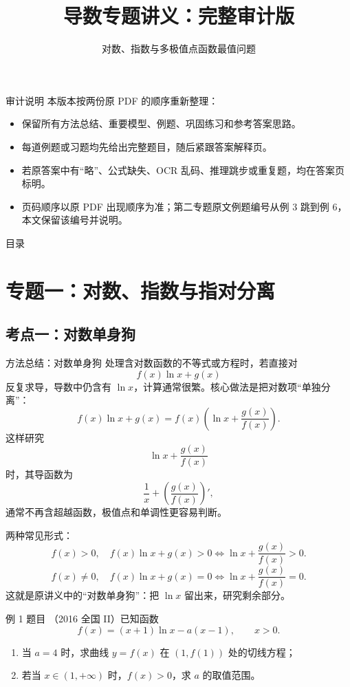 ﻿\documentclass[aspectratio=169,10pt]{ctexbeamer}
\title{导数专题讲义：完整审计版}
\subtitle{对数、指数与多极值点函数最值问题}
\author{}
\date{}
\begin{document}
\begin{frame}
  \titlepage
\end{frame}

\begin{frame}{审计说明}
\small
本版本按两份原 PDF 的顺序重新整理：
\begin{itemize}
  \item 保留所有方法总结、重要模型、例题、巩固练习和参考答案思路。
  \item 每道例题或习题均先给出完整题目，随后紧跟答案解释页。
  \item 若原答案中有“略”、公式缺失、OCR 乱码、推理跳步或重复题，均在答案页标明。
  \item 页码顺序以原 PDF 出现顺序为准；第二专题原文例题编号从例 3 跳到例 6，本文保留该编号并说明。
\end{itemize}
\end{frame}

\begin{frame}{目录}
\tableofcontents
\end{frame}

\section{专题一：对数、指数与指对分离}

\subsection{考点一：对数单身狗}

\begin{frame}[allowframebreaks]{方法总结：对数单身狗}
\small
处理含对数函数的不等式或方程时，若直接对
\[
f(x)\ln x+g(x)
\]
反复求导，导数中仍含有 $\ln x$，计算通常很繁。核心做法是把对数项“单独分离”：
\[
f(x)\ln x+g(x)=f(x)\left(\ln x+\frac{g(x)}{f(x)}\right).
\]
这样研究
\[
\ln x+\frac{g(x)}{f(x)}
\]
时，其导函数为
\[
\frac1x+\left(\frac{g(x)}{f(x)}\right)',
\]
通常不再含超越函数，极值点和单调性更容易判断。

\framebreak

两种常见形式：
\[
f(x)>0,\quad f(x)\ln x+g(x)>0
\Longleftrightarrow
\ln x+\frac{g(x)}{f(x)}>0.
\]
\[
f(x)\ne0,\quad f(x)\ln x+g(x)=0
\Longleftrightarrow
\ln x+\frac{g(x)}{f(x)}=0.
\]
这就是原讲义中的“对数单身狗”：把 $\ln x$ 留出来，研究剩余部分。
\end{frame}

\begin{frame}{例 1 题目}
\small
（2016 全国 II）已知函数
\[
f(x)=(x+1)\ln x-a(x-1),\qquad x>0.
\]
\begin{enumerate}
  \item 当 $a=4$ 时，求曲线 $y=f(x)$ 在 $(1,f(1))$ 处的切线方程；
  \item 若当 $x\in(1,+\infty)$ 时，$f(x)>0$，求 $a$ 的取值范围。
\end{enumerate}
\end{frame}
\end{document}
